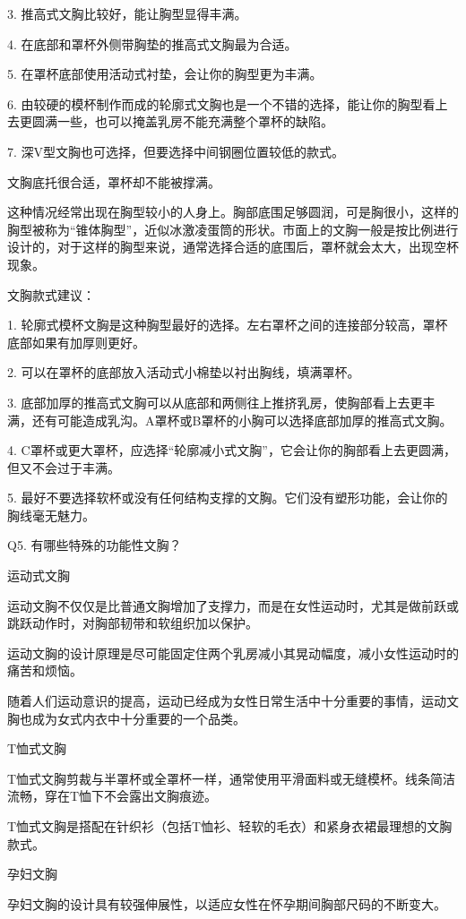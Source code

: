 \documentclass[12pt,UTF8]{ctexbook}
\begin{document}
3. 推高式文胸比较好，能让胸型显得丰满。

4. 在底部和罩杯外侧带胸垫的推高式文胸最为合适。

5. 在罩杯底部使用活动式衬垫，会让你的胸型更为丰满。

6. 由较硬的模杯制作而成的轮廓式文胸也是一个不错的选择，能让你的胸型看上去更圆满一些，也可以掩盖乳房不能充满整个罩杯的缺陷。

7. 深V型文胸也可选择，但要选择中间钢圈位置较低的款式。

文胸底托很合适，罩杯却不能被撑满。

这种情况经常出现在胸型较小的人身上。胸部底围足够圆润，可是胸很小，这样的胸型被称为“锥体胸型”，近似冰激凌蛋筒的形状。市面上的文胸一般是按比例进行设计的，对于这样的胸型来说，通常选择合适的底围后，罩杯就会太大，出现空杯现象。

文胸款式建议：

1. 轮廓式模杯文胸是这种胸型最好的选择。左右罩杯之间的连接部分较高，罩杯底部如果有加厚则更好。

2. 可以在罩杯的底部放入活动式小棉垫以衬出胸线，填满罩杯。

3. 底部加厚的推高式文胸可以从底部和两侧往上推挤乳房，使胸部看上去更丰满，还有可能造成乳沟。A罩杯或B罩杯的小胸可以选择底部加厚的推高式文胸。

4. C罩杯或更大罩杯，应选择“轮廓减小式文胸”，它会让你的胸部看上去更圆满，但又不会过于丰满。

5. 最好不要选择软杯或没有任何结构支撑的文胸。它们没有塑形功能，会让你的胸线毫无魅力。

Q5. 有哪些特殊的功能性文胸？

运动式文胸

运动文胸不仅仅是比普通文胸增加了支撑力，而是在女性运动时，尤其是做前跃或跳跃动作时，对胸部韧带和软组织加以保护。

运动文胸的设计原理是尽可能固定住两个乳房减小其晃动幅度，减小女性运动时的痛苦和烦恼。

随着人们运动意识的提高，运动已经成为女性日常生活中十分重要的事情，运动文胸也成为女式内衣中十分重要的一个品类。

T恤式文胸

T恤式文胸剪裁与半罩杯或全罩杯一样，通常使用平滑面料或无缝模杯。线条简洁流畅，穿在T恤下不会露出文胸痕迹。

T恤式文胸是搭配在针织衫（包括T恤衫、轻软的毛衣）和紧身衣裙最理想的文胸款式。

孕妇文胸

孕妇文胸的设计具有较强伸展性，以适应女性在怀孕期间胸部尺码的不断变大。
\end{document}
